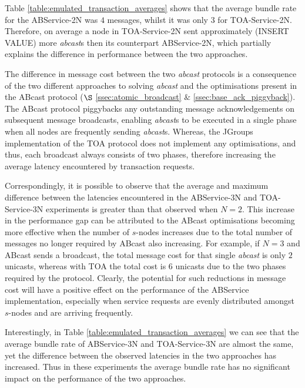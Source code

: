     Table \ref{table:emulated_transaction_averages} shows that the average bundle rate for the ABService-2N was $4$ messages, whilst it was only $3$ for TOA-Service-2N.  Therefore, on average a node in TOA-Service-2N sent approximately (INSERT VALUE) more \emph{abcast}s then its counterpart ABService-2N, which partially explains the difference in performance between the two approaches.  
    
    The difference in message cost between the two \emph{abcast} protocols is a consequence of the two different approaches to solving \emph{abcast} and the optimisations present in the \textsf{ABcast} protocol ($\S$  \ref{ssec:atomic_broadcast} $\&$ \ref{ssec:base_ack_piggyback}).  The \textsf{ABcast} protocol piggybacks any outstanding message acknowledgements on subsequent message broadcasts, enabling \emph{abcast}s to be executed in a single phase when all nodes are frequently sending \emph{abcast}s.  Whereas, the JGroups implementation of the TOA protocol does not implement any optimisations, and thus, each broadcast always consists of two phases, therefore increasing the average latency encountered by transaction requests.  
	
	Correspondingly, it is possible to observe that the average and maximum difference between the latencies encountered in the ABService-3N and TOA-Service-3N experiments is greater than that observed when $N = 2$.  This increase in the performance gap can be attributed to the \textsf{ABcast} optimisations becoming more effective when the number of $s$-nodes increases due to the total number of messages no longer required by \textsf{ABcast} also increasing.  For example, if $N = 3$ and \textsf{ABcast} sends a broadcast, the total message cost for that single \emph{abcast} is only $2$ unicasts, whereas with TOA the total cost is $6$ unicasts due to the two phases required by the protocol.  Clearly, the potential for such reductions in message cost will have a positive effect on the performance of the ABService implementation, especially when service requests are evenly distributed amongst $s$-nodes and are arriving frequently.  
	
    Interestingly, in Table \ref{table:emulated_transaction_averages} we can see that the average bundle rate of ABService-3N and TOA-Service-3N are almost the same, yet the difference between the observed latencies in the two approaches has increased.  	Thus in these experiments the average bundle rate has no significant impact on the performance of the two approaches.  
    

